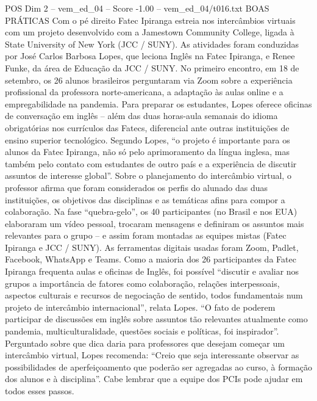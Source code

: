 \begin{textsample}{POS Dim 2 – vem\_ed\_04 – Score -1.00 – vem\_ed\_04/t016.txt}  \label{ex:f2_pos_031}
BOAS PRÁTICAS Com o pé direito Fatec Ipiranga estreia nos intercâmbios virtuais com um projeto desenvolvido com a Jamestown Community College, ligada à State University of New York (JCC / SUNY).
As atividades foram conduzidas por José Carlos Barbosa Lopes, que leciona Inglês na Fatec Ipiranga, e Renee Funke, da área de Educação da JCC / SUNY.
No primeiro encontro, em 18 de setembro, os 26 alunos brasileiros perguntaram via Zoom sobre a experiência profissional da professora norte-americana, a adaptação às aulas online e a empregabilidade na pandemia.
Para preparar os estudantes, Lopes oferece oficinas de conversação em inglês – além das duas horas-aula semanais do idioma obrigatórias nos currículos das Fatecs, diferencial ante outras instituições de ensino superior tecnológico.
Segundo Lopes, “o projeto é importante para os alunos da Fatec Ipiranga, não só pelo aprimoramento da língua inglesa, mas também pelo contato com estudantes de outro país e a experiência de discutir assuntos de interesse global”.
Sobre o planejamento do intercâmbio virtual, o professor afirma que foram considerados os perfis do alunado das duas instituições, os objetivos das disciplinas e as temáticas afins para compor a colaboração.
Na fase “quebra-gelo”, os 40 participantes (no Brasil e nos EUA) elaboraram um vídeo pessoal, trocaram mensagens e definiram os assuntos mais relevantes para o grupo – e assim foram montadas as equipes mistas (Fatec Ipiranga e JCC / SUNY).
As ferramentas digitais usadas foram Zoom, Padlet, Facebook, WhatsApp e Teams.
Como a maioria dos 26 participantes da Fatec Ipiranga frequenta aulas e oficinas de Inglês, foi possível “discutir e avaliar nos grupos a importância de fatores como colaboração, relações interpessoais, aspectos culturais e recursos de negociação de sentido, todos fundamentais num projeto de intercâmbio internacional”, relata Lopes. “O fato de poderem participar de discussões em inglês sobre assuntos tão relevantes atualmente como pandemia, multiculturalidade, questões sociais e políticas, foi inspirador”.
Perguntado sobre que dica daria para professores que desejam começar um intercâmbio virtual, Lopes recomenda: “Creio que seja interessante observar as possibilidades de aperfeiçoamento que poderão ser agregadas ao curso, à formação dos alunos e à disciplina”.
Cabe lembrar que a equipe dos PCIs pode ajudar em todos esses passos.

\end{textsample}
